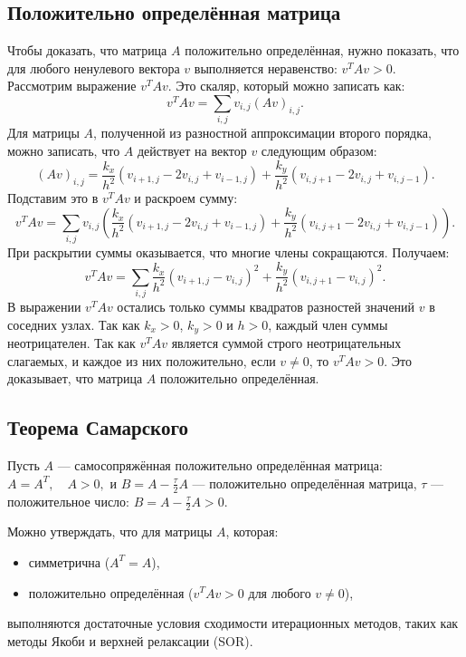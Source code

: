 \documentclass[a4paper, fleqn]{report}
\begin{document}
\subsection*{Положительно определённая матрица}
Чтобы доказать, что матрица $A$ положительно определённая, нужно показать, что для любого ненулевого вектора $v$ выполняется неравенство: $v^T A v > 0$.
Рассмотрим выражение $v^T A v$. Это скаляр, который можно записать как:
\[
v^T A v = \sum_{i,j} v_{i,j} (Av)_{i,j}.
\]
Для матрицы $A$, полученной из разностной аппроксимации второго порядка, можно записать, что $A$ действует на вектор $v$ следующим образом:
\[
(Av)_{i,j} = \frac{k_x}{h^2}(v_{i+1,j} - 2v_{i,j} + v_{i-1,j}) + \frac{k_y}{h^2}(v_{i,j+1} - 2v_{i,j} + v_{i,j-1}).
\]
Подставим это в $v^T A v$ и раскроем сумму:
\[
v^T A v = \sum_{i,j} v_{i,j} \left( \frac{k_x}{h^2}(v_{i+1,j} - 2v_{i,j} + v_{i-1,j}) + \frac{k_y}{h^2}(v_{i,j+1} - 2v_{i,j} + v_{i,j-1}) \right).
\]
При раскрытии суммы оказывается, что многие члены сокращаются. Получаем:
\[
v^T A v = \sum_{i,j} \frac{k_x}{h^2} (v_{i+1,j} - v_{i,j})^2 + \frac{k_y}{h^2} (v_{i,j+1} - v_{i,j})^2.
\]
В выражении $v^T A v$ остались только суммы квадратов разностей значений $v$ в соседних узлах. Так как $k_x > 0$, $k_y > 0$ и $h > 0$, каждый член суммы неотрицателен. Так как $v^T A v$ является суммой строго неотрицательных слагаемых, и каждое из них положительно, если $v \neq 0$, то $v^T A v > 0$. Это доказывает, что матрица $A$ положительно определённая.

\subsection*{Теорема Самарского}
Пусть $A$ — самосопряжённая положительно определённая матрица:  
$A = A^T, \quad A > 0,$  
и $B = A - \frac{\tau}{2} A$ — положительно определённая матрица, $\tau$ — положительное число:  
$B = A - \frac{\tau}{2} A > 0.$

Можно утверждать, что для матрицы $A$, которая:
\begin{itemize}
    \item симметрична ($A^T = A$),
    \item положительно определённая ($v^T A v > 0$ для любого $v \neq 0$),
\end{itemize}
выполняются достаточные условия сходимости итерационных методов, таких как методы Якоби и верхней релаксации (SOR). 
\end{document}
